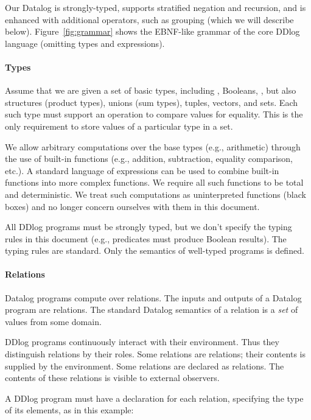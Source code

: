 Our Datalog is strongly-typed, supports stratified negation and recursion, and
is enhanced with additional operators, such as grouping (which we will describe below).
Figure~\ref{fig:grammar} shows the EBNF-like grammar of the core DDlog language
(omitting types and expressions).

\paragraph{Types}

Assume that we are given a set of basic types, including , Booleans, , 
but also structures (product types), unions (sum types), tuples, vectors, and sets.
Each such type must support an operation to compare values for equality.  This is the only
requirement to store values of a particular type in a set.

We allow arbitrary computations over the base types (e.g., arithmetic) through the use of
built-in functions (e.g., addition, subtraction, equality comparison, etc.).  A standard
language of expressions can be used to combine built-in functions into more complex
functions.  We require all such functions to be total and deterministic.
We treat such computations as uninterpreted functions (black boxes) and no longer
concern ourselves with them in this document.

All DDlog programs must be strongly typed, but we don't specify the typing rules in
this document (e.g., predicates must produce Boolean results).  
The typing rules are standard.  Only the semantics of well-typed
programs is defined.

\paragraph{Relations}

Datalog programs compute over relations.  The inputs and outputs of a Datalog
program are relations.  The standard Datalog semantics of 
a relation is a \emph{set} of values from some domain.

DDlog programs continuously interact with their environment.  Thus they 
distinguish relations by their roles.  Some relations are  relations;
their contents is supplied by the environment.  Some relations
are declared as  relations.  The contents of these relations is visible
to external observers.

A DDlog program must have a declaration for each relation, specifying
the type of its elements, as in this example:

